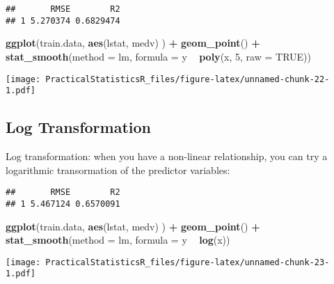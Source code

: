 \documentclass[]{article}
\newenvironment{Shaded}{\begin{snugshade}}{\end{snugshade}}
\newcommand{\CommentTok}[1]{\textcolor[rgb]{0.56,0.35,0.01}{\textit{#1}}}
\newcommand{\DataTypeTok}[1]{\textcolor[rgb]{0.13,0.29,0.53}{#1}}
\newcommand{\DecValTok}[1]{\textcolor[rgb]{0.00,0.00,0.81}{#1}}
\newcommand{\KeywordTok}[1]{\textcolor[rgb]{0.13,0.29,0.53}{\textbf{#1}}}
\newcommand{\NormalTok}[1]{#1}
\newcommand{\OperatorTok}[1]{\textcolor[rgb]{0.81,0.36,0.00}{\textbf{#1}}}
\newcommand{\OtherTok}[1]{\textcolor[rgb]{0.56,0.35,0.01}{#1}}
\newcommand{\StringTok}[1]{\textcolor[rgb]{0.31,0.60,0.02}{#1}}
\begin{document}
{\begin{verbatim}
##       RMSE        R2
## 1 5.270374 0.6829474
\end{verbatim}

\begin{Shaded}
\begin{Highlighting}[]
\KeywordTok{ggplot}\NormalTok{(train.data, }\KeywordTok{aes}\NormalTok{(lstat, medv) ) }\OperatorTok{+}
\StringTok{  }\KeywordTok{geom_point}\NormalTok{() }\OperatorTok{+}
\StringTok{  }\KeywordTok{stat_smooth}\NormalTok{(}\DataTypeTok{method =}\NormalTok{ lm, }\DataTypeTok{formula =}\NormalTok{ y }\OperatorTok{~}\StringTok{ }\KeywordTok{poly}\NormalTok{(x, }\DecValTok{5}\NormalTok{, }\DataTypeTok{raw =} \OtherTok{TRUE}\NormalTok{))}
\end{Highlighting}
\end{Shaded}

\texttt{[image: PracticalStatisticsR\_files/figure-latex/unnamed-chunk-22-1.pdf]}

\hypertarget{log-transformation}{%
\subsection{Log Transformation}\label{log-transformation}}

Log transformation: when you have a non-linear relationship, you can try
a logarithmic transormation of the predictor variables:

\begin{Shaded}
\end{Shaded}

\begin{verbatim}
##       RMSE        R2
## 1 5.467124 0.6570091
\end{verbatim}

\begin{Shaded}
\begin{Highlighting}[]
\KeywordTok{ggplot}\NormalTok{(train.data, }\KeywordTok{aes}\NormalTok{(lstat, medv) ) }\OperatorTok{+}
\StringTok{  }\KeywordTok{geom_point}\NormalTok{() }\OperatorTok{+}
\StringTok{  }\KeywordTok{stat_smooth}\NormalTok{(}\DataTypeTok{method =}\NormalTok{ lm, }\DataTypeTok{formula =}\NormalTok{ y }\OperatorTok{~}\StringTok{ }\KeywordTok{log}\NormalTok{(x))}
\end{Highlighting}
\end{Shaded}

\texttt{[image: PracticalStatisticsR\_files/figure-latex/unnamed-chunk-23-1.pdf]}
\end{document}
